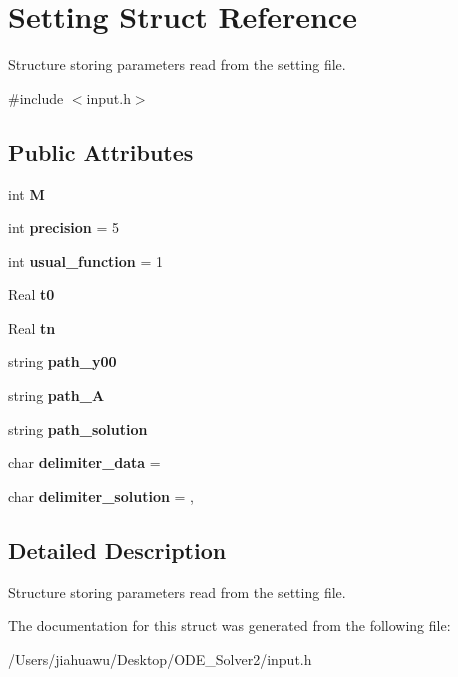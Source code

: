 \hypertarget{struct_setting}{}\section{Setting Struct Reference}
\label{struct_setting}


Structure storing parameters read from the setting file.  




{\ttfamily \#include $<$input.\+h$>$}

\subsection*{Public Attributes}
\begin{DoxyCompactItemize}
\item 
\mbox{\label{struct_setting_a7d0cd8484c787085547a178a311239bd}} 
int {\bfseries M}
\item 
\mbox{\label{struct_setting_ab12392850916088ffc92d7eeccf84950}} 
int {\bfseries precision} = 5
\item 
\mbox{\label{struct_setting_aa4971ccaf90929605fc4f326e9f0b08a}} 
int {\bfseries usual\+\_\+function} = 1
\item 
\mbox{\label{struct_setting_a60b5d988c449e64b535813eeff85a55b}} 
Real {\bfseries t0}
\item 
\mbox{\label{struct_setting_a18996fc4e88679942fc70d4379053d77}} 
Real {\bfseries tn}
\item 
\mbox{\label{struct_setting_a9f9d6c2e92d90956166bbe755200c3a5}} 
string {\bfseries path\+\_\+y00}
\item 
\mbox{\label{struct_setting_aced1bbb9f4dc3f67c971cbac3f71c4ec}} 
string {\bfseries path\+\_\+A}
\item 
\mbox{\label{struct_setting_a7998cafc0fbfa965728f0473b786be97}} 
string {\bfseries path\+\_\+solution}
\item 
\mbox{\label{struct_setting_ab533af9e0e9b0f0d574e8caa57fc5c49}} 
char {\bfseries delimiter\+\_\+data} = \textquotesingle{} \textquotesingle{}
\item 
\mbox{\label{struct_setting_a408ec115a7aef35d1ea1822417b75701}} 
char {\bfseries delimiter\+\_\+solution} = \textquotesingle{},\textquotesingle{}
\end{DoxyCompactItemize}


\subsection{Detailed Description}
Structure storing parameters read from the setting file. 

The documentation for this struct was generated from the following file\+:\begin{DoxyCompactItemize}
\item 
/\+Users/jiahuawu/\+Desktop/\+O\+D\+E\+\_\+\+Solver2/input.\+h\end{DoxyCompactItemize}
